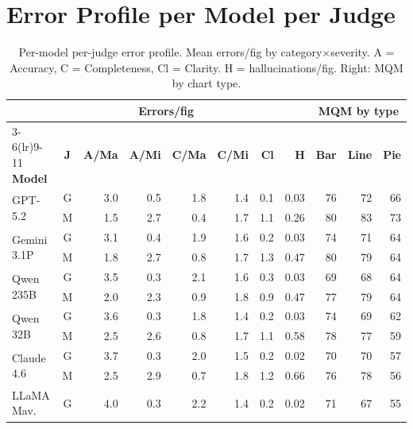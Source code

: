 \newpage
\section{Error Profile per Model per Judge}
\label{tab:app-error-profile}

\begin{table}[H]
\centering
\scriptsize
\caption{Per-model per-judge error profile. Mean errors/fig by category$\times$severity. A = Accuracy, C = Completeness, Cl = Clarity. H = hallucinations/fig. Right: MQM by chart type.}\label{tab:error-profile-full}
\setlength{\tabcolsep}{2.5pt}
\begin{tabular}{@{}l c rrrr r r rrr@{}}
\toprule
 & & \multicolumn{4}{c}{\textbf{Errors/fig}} & & & \multicolumn{3}{c}{\textbf{MQM by type}} \\
\cmidrule(lr){3-6}\cmidrule(lr){9-11}
\textbf{Model} & \textbf{J} & \textbf{A/Ma} & \textbf{A/Mi} & \textbf{C/Ma} & \textbf{C/Mi} & \textbf{Cl} & \textbf{H} & \textbf{Bar} & \textbf{Line} & \textbf{Pie} \\
\midrule
\multirow{2}{*}{GPT-5.2}      & G & 3.0 & 0.5 & 1.8 & 1.4 & 0.1 & 0.03 & 76 & 72 & 66 \\
                               & M & 1.5 & 2.7 & 0.4 & 1.7 & 1.1 & 0.26 & 80 & 83 & 73 \\
\multirow{2}{*}{Gemini 3.1P}  & G & 3.1 & 0.4 & 1.9 & 1.6 & 0.2 & 0.03 & 74 & 71 & 64 \\
                               & M & 1.8 & 2.7 & 0.8 & 1.7 & 1.3 & 0.47 & 80 & 79 & 64 \\
\multirow{2}{*}{Qwen 235B}    & G & 3.5 & 0.3 & 2.1 & 1.6 & 0.3 & 0.03 & 69 & 68 & 64 \\
                               & M & 2.0 & 2.3 & 0.9 & 1.8 & 0.9 & 0.47 & 77 & 79 & 64 \\
\multirow{2}{*}{Qwen 32B}     & G & 3.6 & 0.3 & 1.8 & 1.4 & 0.2 & 0.03 & 74 & 69 & 62 \\
                               & M & 2.5 & 2.6 & 0.8 & 1.7 & 1.1 & 0.58 & 78 & 77 & 59 \\
\multirow{2}{*}{Claude 4.6}   & G & 3.7 & 0.3 & 2.0 & 1.5 & 0.2 & 0.02 & 70 & 70 & 57 \\
                               & M & 2.5 & 2.9 & 0.7 & 1.8 & 1.2 & 0.66 & 76 & 78 & 56 \\
\multirow{2}{*}{LLaMA Mav.}   & G & 4.0 & 0.3 & 2.2 & 1.4 & 0.2 & 0.02 & 71 & 67 & 55 \\

\end{tabular}
\end{table}

